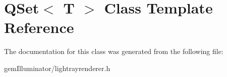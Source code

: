 \hypertarget{class_q_set}{}\section{Q\+Set$<$ T $>$ Class Template Reference}
\label{class_q_set}


The documentation for this class was generated from the following file\+:\begin{DoxyCompactItemize}
\item 
gem\+Illuminator/lightrayrenderer.\+h\end{DoxyCompactItemize}
